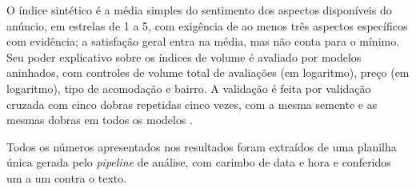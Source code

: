 O índice sintético é a média simples do sentimento dos aspectos disponíveis do anúncio, em estrelas de 1 a 5, com exigência de ao menos três aspectos específicos com evidência; a satisfação geral entra na média, mas não conta para o mínimo. Seu poder explicativo sobre os índices de volume é avaliado por modelos aninhados, com controles de volume total de avaliações (em logaritmo), preço (em logaritmo), tipo de acomodação e bairro. A validação é feita por validação cruzada com cinco dobras repetidas cinco vezes, com a mesma semente e as mesmas dobras em todos os modelos \citep{pedregosa2011}.

Todos os números apresentados nos resultados foram extraídos de uma planilha única gerada pelo \textit{pipeline} de análise, com carimbo de data e hora e conferidos um a um contra o texto.

